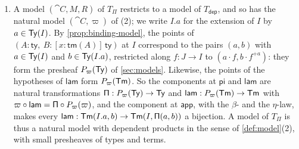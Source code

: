 \begin{example}
\begin{enumerate}
        \item A model $(\cat{C}, M, R)$ of $T_\Pi$ restricts to a model of $T_{\mathsf{dep}}$, and so has the natural model $(\cat{C}, \varpi)$ of (2); we write $I.a$ for the extension of $I$ by $a \in \mathsf{Ty}(I)$. By \cref{prop:binding-model}, the points of $(A : \mathsf{ty},\ B : [x : \mathsf{tm}(A)]\,\mathsf{ty})$ at $I$ correspond to the pairs $(a, b)$ with $a \in \mathsf{Ty}(I)$ and $b \in \mathsf{Ty}(I.a)$, restricted along $f : J \to I$ to $(a \cdot f, b \cdot f^{+a})$: they form the presheaf $P_\varpi(\mathsf{Ty})$ of \cref{sec:models}. Likewise, the points of the hypotheses of $\mathsf{lam}$ form $P_\varpi(\mathsf{Tm})$. So the components at $\mathsf{pi}$ and $\mathsf{lam}$ are natural transformations $\mathsf{\Pi} : P_\varpi(\mathsf{Ty}) \to \mathsf{Ty}$ and $\mathsf{lam} : P_\varpi(\mathsf{Tm}) \to \mathsf{Tm}$ with $\varpi \circ \mathsf{lam} = \mathsf{\Pi} \circ P_\varpi(\varpi)$, and the component at $\mathsf{app}$, with the $\beta$- and the $\eta$-law, makes every $\mathsf{lam} : \mathsf{Tm}(I.a, b) \to \mathsf{Tm}(I, \mathsf{\Pi}(a, b))$ a bijection. A model of $T_\Pi$ is thus a natural model with dependent products in the sense of \cref{def:model}(2), with small presheaves of types and terms.
    \end{enumerate}
\end{example}